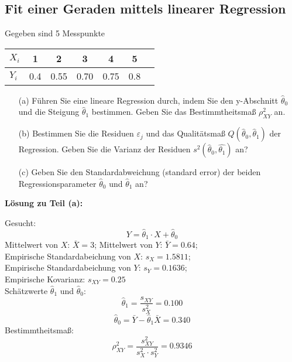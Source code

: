 \subsection{Fit einer Geraden mittels linearer Regression}
Gegeben sind 5 Messpunkte
\begin{table}[htb!]
	\centering
	\begin{tabular}{l|c c c c c c}
		$X_i$ & 1 & 2 & 3 & 4 & 5 \\ \hline
		$Y_i$ & 0.4 & 0.55 & 0.70 & 0.75 & 0.8
	\end{tabular}
\end{table}
\begin{itemize}
	\item [(a)] Führen Sie eine lineare Regression durch, indem
	Sie den y-Abschnitt $\hat\theta_0$ und die Steigung $\hat\theta_1$ bestimmen. Geben Sie das Bestimmtheitsmaß $\rho_{XY}^2$ an.
	\item[(b)] Bestimmen Sie die Residuen $\varepsilon_j$ und das
	Qualitätsmaß $Q(\hat\theta _0,\hat\theta _1)$ der Regression. Geben Sie die Varianz der Residuen
	$s^2(\hat\theta_0,\hat{\theta_1})$ an?
	\item[(c)] Geben Sie den Standardabweichung (standard error) der beiden
	Regressionsparameter $\hat\theta_0$ und $\hat\theta_1$ an?

\end{itemize}

\textbf{Lösung zu Teil (a):}

Gesucht:
\[
Y = \hat\theta_1 \cdot X + \hat \theta_0
\]
Mittelwert von $X$: $\bar{X} = 3$; Mittelwert von $Y$: $\bar{Y} = 0.64$; \\
Empirische Standardabeichung von $X$: $s_X = 1.5811$; \\
Empirische Standardabeichung von $Y$: $s_Y = 0.1636$; \\
Empirische Kovarianz: $s_{XY} = 0.25$ \\
Schätzwerte $\hat{\theta}_1$ und $\hat{\theta}_0$:
\[
\hat{\theta}_1 = \frac{s_{XY} }{s_X^2 } = 0.100
\]
\[
\hat{\theta}_0 = \bar {Y} - \hat{\theta}_1 \bar {X} = 0.340
\]
Bestimmtheitsmaß:
\[
\rho_{XY}^2 = \frac{s_{XY}^2 }{s_X^2 \cdot s_Y^2 } = 0.9346
\]

